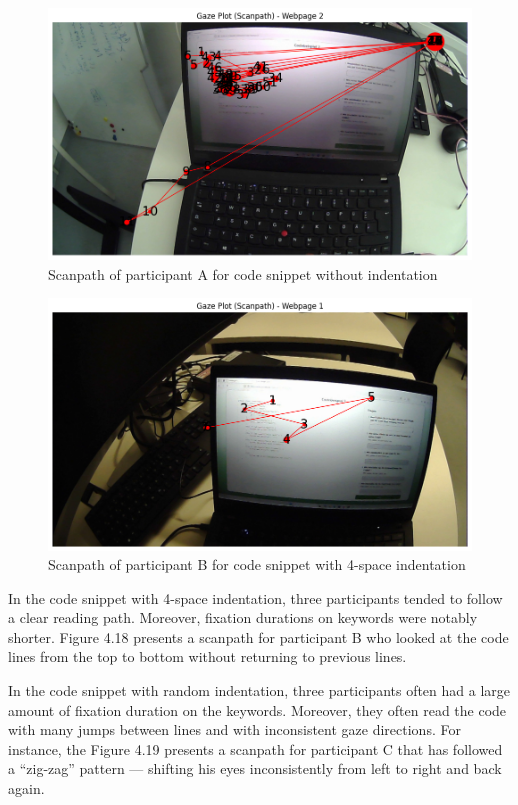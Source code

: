 \begin{figure} [H]
  \centering
  \includegraphics[scale=0.6]{figures/0-ind-rechner.png}
  \caption{Scanpath of participant A for code snippet without indentation }
  \label{fig:AnhangsChor}
\end{figure}


\begin{figure} [H]
  \centering
  \includegraphics[scale=0.6]{figures/4-ind.png}
  \caption{Scanpath of participant B for code snippet with 4-space indentation}
  \label{fig:AnhangsChor}
\end{figure}

In the code snippet with 4-space indentation, three participants tended to follow a clear reading path. Moreover, fixation durations on keywords were notably shorter. Figure 4.18 presents a scanpath for participant B who looked at the code lines from the top to bottom without returning to previous lines.  


In the code snippet with random indentation, three participants often had a large amount of fixation duration on the keywords.  Moreover, they often read the code with many jumps between lines and with inconsistent gaze directions. For instance, the Figure 4.19 presents a scanpath for participant C that has followed a “zig-zag” pattern — shifting his eyes inconsistently from left to right and back again.  



